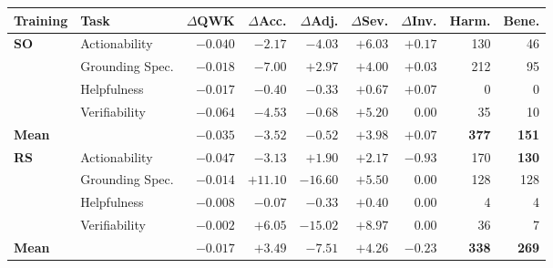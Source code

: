 \begin{table}[!tp]
\centering
\captionsetup{font=normalsize,skip=2pt}
\small
\setlength{\tabcolsep}{3pt}
\renewcommand{\arraystretch}{1.05}

\begin{tabular}{@{}llrrrrrrr@{}}
\toprule
Training & Task
& $\Delta$QWK
& $\Delta$Acc.
& $\Delta$Adj.
& $\Delta$Sev.
& $\Delta$Inv.
& Harm.
& Bene. \\
\midrule

\multirow{4}{*}{\textbf{SO}}
& Actionability
& $-0.040$ & $-2.17$ & $-4.03$ & $+6.03$ & $+0.17$
& 130 & 46 \\

& Grounding Spec.
& $-0.018$ & $-7.00$ & $+2.97$ & $+4.00$ & $+0.03$
& 212 & 95 \\

& Helpfulness
& $-0.017$ & $-0.40$ & $-0.33$ & $+0.67$ & $+0.07$
& 0 & 0 \\

& Verifiability
& $-0.064$ & $-4.53$ & $-0.68$ & $+5.20$ & $0.00$
& 35 & 10 \\

\cmidrule(l){2-9}
\textbf{Mean} &
& $\mathbf{-0.035}$
& $\mathbf{-3.52}$
& $\mathbf{-0.52}$
& $\mathbf{+3.98}$
& $\mathbf{+0.07}$
& \textbf{377}
& \textbf{151} \\

\midrule

\multirow{4}{*}{\textbf{RS}}
& Actionability
& $-0.047$ & $-3.13$ & $\mathbf{+1.90}$ & $+2.17$
& $\mathbf{-0.93}$ & 170 & \textbf{130} \\

& Grounding Spec.
& $-0.014$ & $\mathbf{+11.10}$ & $\mathbf{-16.60}$
& $+5.50$ & $0.00$ & 128 & 128 \\

& Helpfulness
& $-0.008$ & $-0.07$ & $-0.33$ & $+0.40$ & $0.00$
& 4 & 4 \\

& Verifiability
& $\mathbf{-0.002}$ & $\mathbf{+6.05}$ & $\mathbf{-15.02}$
& $+8.97$ & $0.00$ & 36 & 7 \\

\cmidrule(l){2-9}
\textbf{Mean} &
& $\mathbf{-0.017}$
& $\mathbf{+3.49}$
& $\mathbf{-7.51}$
& $\mathbf{+4.26}$
& $\mathbf{-0.23}$
& \textbf{338}
& \textbf{269} \\


\end{tabular}
\end{table}
